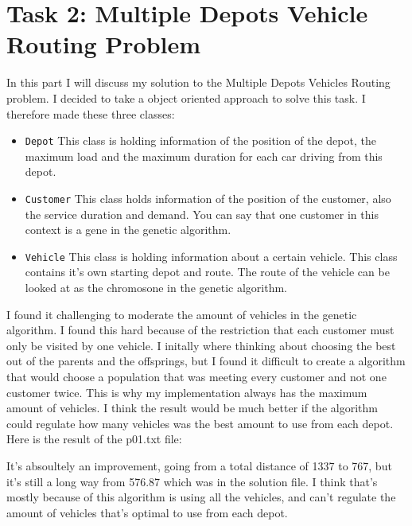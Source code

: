 \documentclass[titlepage, 11pt]{article}
\begin{document}
    \section{Task 2: Multiple Depots Vehicle Routing Problem}
    In this part I will discuss my solution to the Multiple Depots Vehicles Routing problem.
    I decided to take a object oriented approach to solve this task. I therefore made these three classes:
    \begin{itemize}
        \item \lstinline{Depot} This class is holding information of the position of the depot, the maximum load and the maximum duration for each car driving from this depot.
        \item \lstinline{Customer} This class holds information of the position of the customer, also the service duration and demand. You can say that one customer in this context is a gene in the genetic algorithm.
        \item \lstinline{Vehicle} This class is holding information about a certain vehicle. This class contains it's own starting depot and route. The route of the vehicle can be looked at as the chromosone in the genetic algorithm.
    \end{itemize}
    I found it challenging to moderate the amount of vehicles in the genetic algorithm. I found this hard because of the restriction that each customer must only be visited by one vehicle. I initally where thinking about choosing the best out of the parents and the offsprings, but I found it difficult to create a algorithm that would choose a population that was meeting every customer and not one customer twice.
    This is why my implementation always has the maximum amount of vehicles. I think the result would be much better if the algorithm could regulate how many vehicles was the best amount to use from each depot.
    Here is the result of the p01.txt file:
    \begin{figure}
        \centering
        \qquad
        \label{fig:example}
    \end{figure}
    \newpage
It's absoultely an improvement, going from a total distance of 1337 to 767, but it's still a long way from 576.87 which was in the solution file. I think that's mostly because of this algorithm is using all the vehicles, and can't regulate the amount of vehicles that's optimal to use from each depot. 
\end{document}
